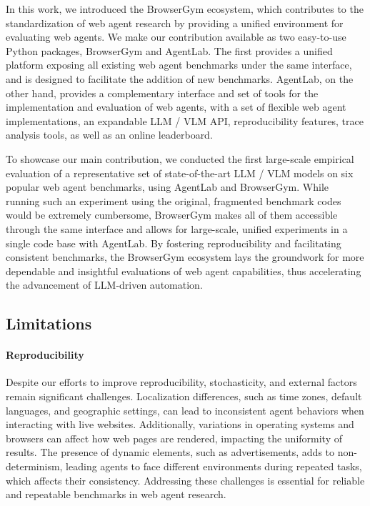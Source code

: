 \documentclass[10pt]{article} %
\begin{document}
In this work, we introduced the BrowserGym ecosystem, which contributes to the standardization of web agent research by providing a unified environment for evaluating web agents. We make our contribution available as two easy-to-use Python packages, BrowserGym and AgentLab. The first provides a unified platform exposing all existing web agent benchmarks under the same interface, and is designed to facilitate the addition of new benchmarks. AgentLab, on the other hand, provides a complementary interface and set of tools for the implementation and evaluation of web agents, with a set of flexible web agent implementations, an expandable LLM / VLM API, reproducibility features, trace analysis tools, as well as an online leaderboard.

To showcase our main contribution, we conducted the first large-scale empirical evaluation of a representative set of state-of-the-art LLM / VLM models on six popular web agent benchmarks, using AgentLab and BrowserGym. While running such an experiment using the original, fragmented benchmark codes would be extremely cumbersome, BrowserGym makes all of them accessible through the same interface and allows for large-scale, unified experiments in a single code base with AgentLab. By fostering reproducibility and facilitating consistent benchmarks, the BrowserGym ecosystem lays the groundwork for more dependable and insightful evaluations of web agent capabilities, thus accelerating the advancement of LLM-driven automation.

\subsection{Limitations}
\label{sec:limitations}

\paragraph{Reproducibility} 
Despite our efforts to improve reproducibility, stochasticity, and external factors remain significant challenges. Localization differences, such as time zones, default languages, and geographic settings, can lead to inconsistent agent behaviors when interacting with live websites. Additionally, variations in operating systems and browsers can affect how web pages are rendered, impacting the uniformity of results. The presence of dynamic elements, such as advertisements, adds to non-determinism, leading agents to face different environments during repeated tasks, which affects their consistency. Addressing these challenges is essential for reliable and repeatable benchmarks in web agent research.
\end{document}
